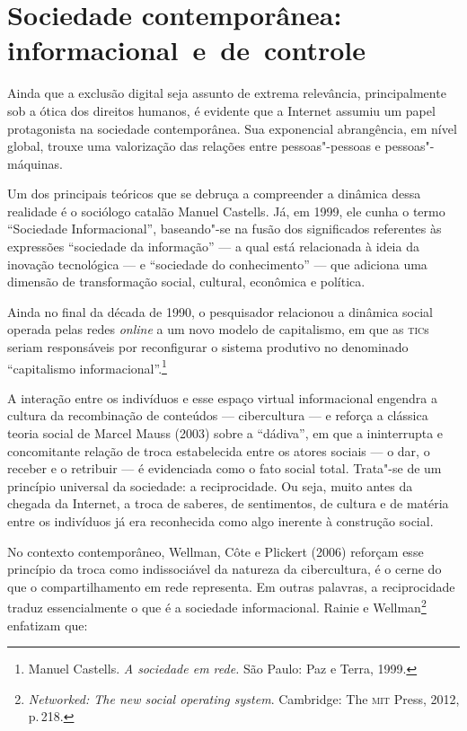 \section{Sociedade contemporânea: informacional~e~de~controle}

Ainda que a exclusão digital seja assunto de extrema relevância,
principalmente sob a ótica dos direitos humanos, é evidente que a
Internet assumiu um papel protagonista na sociedade contemporânea. Sua
exponencial abrangência, em nível global, trouxe uma valorização das
relações entre pessoas"-pessoas e pessoas"-máquinas.

Um dos principais teóricos que se debruça a compreender a dinâmica dessa
realidade é o sociólogo catalão Manuel Castells. Já, em 1999, ele cunha
o termo ``Sociedade Informacional'', baseando"-se na fusão dos
significados referentes às expressões ``sociedade da informação'' --- a
qual está relacionada à ideia da inovação tecnológica --- e ``sociedade do
conhecimento'' --- que adiciona uma dimensão de transformação social,
cultural, econômica e política.

Ainda no final da década de 1990, o pesquisador relacionou a dinâmica
social operada pelas redes \emph{online} a um novo modelo de capitalismo, em
que as \textsc{tic}s seriam responsáveis por reconfigurar o sistema produtivo no
denominado ``capitalismo informacional''.\footnote{Manuel Castells. \emph{A sociedade em rede.} São Paulo: Paz e Terra, 1999.}

A interação entre os indivíduos e esse espaço virtual informacional
engendra a cultura da recombinação de conteúdos --- cibercultura --- e
reforça a clássica teoria social de Marcel Mauss (2003) sobre a
``dádiva'', em que a ininterrupta e concomitante relação de troca
estabelecida entre os atores sociais --- o dar, o receber e o retribuir
--- é evidenciada como o fato social total. Trata"-se de um princípio
universal da sociedade: a reciprocidade. Ou seja, muito antes da chegada
da Internet, a troca de saberes, de sentimentos, de cultura e de matéria
entre os indivíduos já era reconhecida como algo inerente à construção
social.

No contexto contemporâneo, Wellman, Côte e Plickert (2006) reforçam esse
princípio da troca como indissociável da natureza da cibercultura, é o
cerne do que o compartilhamento em rede representa. Em outras palavras,
a reciprocidade traduz essencialmente o que é a sociedade informacional.
Rainie e Wellman\footnote{\emph{Networked: The new social
operating system}. Cambridge: The \textsc{mit} Press, 2012, p.\,218.} enfatizam que:

